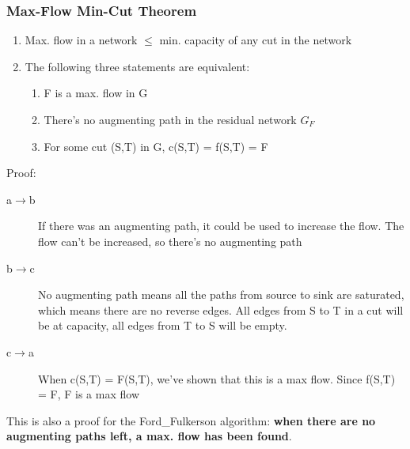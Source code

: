 \newpage
\subsubsection{Max-Flow Min-Cut Theorem}
\begin{enumerate}
    \item Max. flow in a network $\leq$ min. capacity of any cut in the network
    \item The following three statements are equivalent:
    \begin{enumerate}
        \item F is a max. flow in G 
        \item There's no augmenting path in the residual network $G_F$
        \item For some cut (S,T) in G, c(S,T) = f(S,T) = F 
    \end{enumerate}
\end{enumerate}

Proof:
\begin{description}
    \item [a$\rightarrow$b] If there was an augmenting path, it could be used to increase the flow. The flow can't be increased, so there's no augmenting path
    \item [b$\rightarrow$c] No augmenting path means all the paths from source to sink are saturated, which means there are no reverse edges. All edges from S to T in a cut will be at capacity, all edges from T to S will be empty.
    \item [c$\rightarrow$a] When c(S,T) = F(S,T), we've shown that this is a max flow. Since f(S,T) = F, F is a max flow
\end{description}

\noindent This is also a proof for the Ford\_Fulkerson algorithm: \textbf{when there are no augmenting paths left, a max. flow has been found}. 
